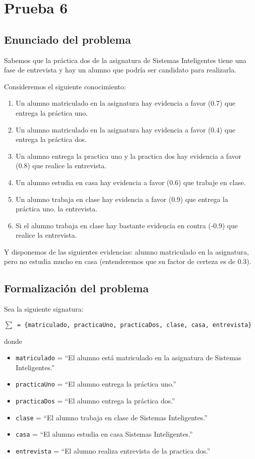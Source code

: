 \section{Prueba 6}
\subsection{Enunciado del problema}
\par Sabemos que la práctica dos de la asignatura de Sistemas Inteligentes tiene una
fase de entrevista y hay un alumno que podría ser candidato para realizarla.
\par Consideremos el siguiente conocimiento:
\begin{enumerate}
    \item Un alumno matriculado en la asignatura hay evidencia a favor (0.7) que entrega la práctica uno.
    \item Un alumno matriculado en la asignatura hay evidencia a favor (0.4) que entrega la práctica dos.
    \item Un alumno entrega la practica uno y la practica dos hay evidencia a favor (0.8) que
realice la entrevista.
    \item Un alumno estudia en casa hay evidencia a favor (0.6) que trabaje en clase. 
    \item Un alumno trabaja en clase hay evidencia a favor (0.9) que entrega la práctica uno.
la entrevista.
    \item Si el alumno trabaja en clase hay bastante evidencia en contra (-0.9) que realice la entrevista.
\end{enumerate}
\par Y disponemos de las siguientes evidencias: alumno matriculado en la asignatura,
pero no estudia mucho en casa (entenderemos que su factor de certeza es de 0.3).

\subsection{Formalización del problema}
\par Sea la siguiente signatura:
\par \texttt{$\sum$ = \{matriculado, practicaUno, practicaDos, clase, casa, entrevista\}}
\par donde
\begin{itemize}
    \item \texttt{matriculado} = ``El alumno está matriculado en la asignatura de Sistemas Inteligentes.''
    \item \texttt{practicaUno} = ``El alumno entrega la práctica uno.''
    \item \texttt{practicaDos} = ``El alumno entrega la práctica dos.''
    \item \texttt{clase} = ``El alumno trabaja en clase de Sistemas Inteligentes.''
    \item \texttt{casa} = ``El alumno estudia en casa Sistemas Inteligentes.''
    \item \texttt{entrevista} = ``El alumno realiza entrevista de la practica dos.''
\end{itemize}
\newpage
